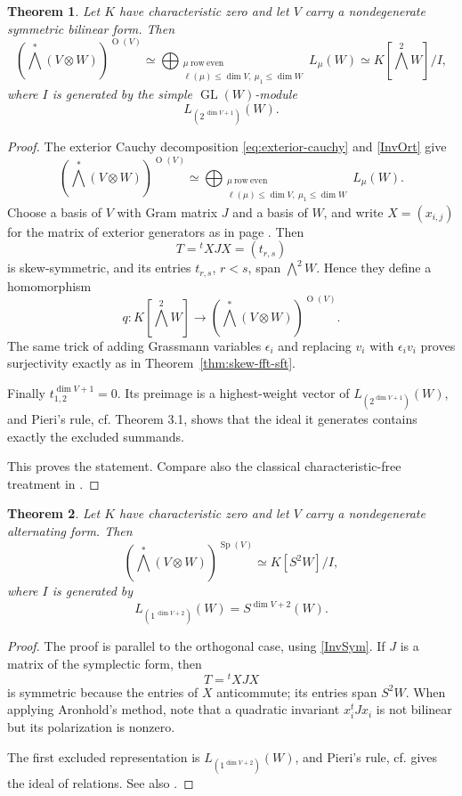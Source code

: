 \documentclass[10pt]{amsart}
\newtheorem{theorem}{Theorem}[section]
\theoremstyle{definition}
\theoremstyle{remark}
\newcommand{\GL}{\operatorname{GL}}
\newcommand{\Sp}{\operatorname{Sp}}
\newcommand{\OO}{\operatorname{O}}
\begin{document}
\begin{theorem}
\label{thm:orthogonal}
Let $K$ have characteristic zero and let $V$ carry a nondegenerate
symmetric bilinear form. Then
\[
\left(\bigwedge^*(V\otimes W)\right)^{\OO(V)}\simeq
\bigoplus_{\substack{\mu\ \mathrm{row\ even}\\
\ell(\mu)\leq\dim V,\ \mu_1\leq\dim W}}L_\mu(W)
\simeq K[\bigwedge^2W]/I,
\]
where $I$ is generated by the simple $\GL(W)$-module
\[
L_{(2^{\,\dim V+1})}(W).
\]
\end{theorem}

\begin{proof}
The exterior Cauchy decomposition \eqref{eq:exterior-cauchy}
 and \eqref{InvOrt} give
\[
\left(\bigwedge^*(V\otimes W)\right)^{\OO(V)}
\simeq
\bigoplus_{\substack{\mu\ \mathrm{row\ even}\\
\ell(\mu)\leq\dim V,\ \mu_1\leq\dim W}}L_\mu(W).
\]
Choose a basis of $V$ with Gram matrix $J$ and a basis of $W$, and write
$X=(x_{i,j})$ for the matrix of exterior generators as in page \pageref{lafond}.  Then
\[
T={}^tXJX=(t_{r,s})
\]
is skew-symmetric, and its entries $t_{r,s}$, $r<s$, span
$\bigwedge^2W$.  Hence they define a homomorphism
\[
q:K[\bigwedge^2W]\longrightarrow
\left(\bigwedge^*(V\otimes W)\right)^{\OO(V)}.
\]
The same trick of adding Grassmann variables $\epsilon_i$  and replacing $v_i$ with $\epsilon_iv_i$  proves
surjectivity exactly as in Theorem~\ref{thm:skew-fft-sft}.\medskip

Finally $t_{1,2}^{\dim V+1}=0$.  Its preimage is a highest-weight vector
of $L_{(2^{\dim V+1})}(W)$, and Pieri's rule, cf.  \cite{Abd} Theorem 3.1, shows that the ideal it
generates contains exactly the excluded summands.  \smallskip

This proves the
statement.  Compare also the classical characteristic-free treatment
in \cite{DeConciniProcesi1976}.
\end{proof}

\begin{theorem}
\label{thm:symplectic}
Let $K$ have characteristic zero and let $V$ carry a nondegenerate
alternating form. Then
\[
\left(\bigwedge^*(V\otimes W)\right)^{\Sp(V)}
\simeq K[S^2W]/I,
\]
where $I$ is generated by
\[
L_{(1^{\,\dim V+2})}(W)=S^{\dim V+2}(W).
\]
\end{theorem}

\begin{proof}
The proof is parallel to the orthogonal case, using \eqref{InvSym}.
If $J$ is a matrix of the symplectic form, then
\[
T={}^tXJX
\]
is symmetric because the entries of $X$ anticommute; its entries span
$S^2W$.  When applying Aronhold's method, note that  a quadratic invariant $x_i^tJx_i $  is not  bilinear but its polarization is nonzero. \smallskip


 The first excluded representation is
$L_{(1^{\dim V+2})}(W)$, and Pieri's rule, cf. \cite{Ab}  gives the ideal of relations.
See also \cite{Weyl,DeConciniProcesi1976}.
\end{proof}
\end{document}
